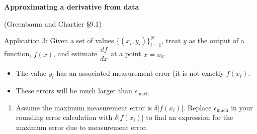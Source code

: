 \documentclass[12pt,letterpaper,noanswers]{exam}
\begin{document}
\noindent\textbf{Approximating a derivative from data}
\begin{tcolorbox}
(Greenbaum and Chartier \S 9.1)

Application 3: Given a set of values $\{(x_i,y_i)\}_{i=1}^N$, treat $y$ as the output of a function, $f(x)$, and estimate $\dfrac{df}{dx}$ at a point $x = x_0$.
\begin{itemize}
\itemsep0pt
    \item The value $y_i$ has an associated measurement error (it is not exactly $f(x_i)$.
    \item These errors will be much larger than $\epsilon_{\text{mach}}$
\end{itemize}
\end{tcolorbox}
\begin{enumerate}[resume=classQ]
\item Assume the maximum measurement error is $\delta \vert f(x_i)\vert$.  Replace $\epsilon_{\text{mach}}$ in your rounding error calculation with $\delta \vert f(x_i)\vert$ to find an expression for the maximum error due to measurement error.

\vspace{1in}


\end{enumerate}
\end{document}
